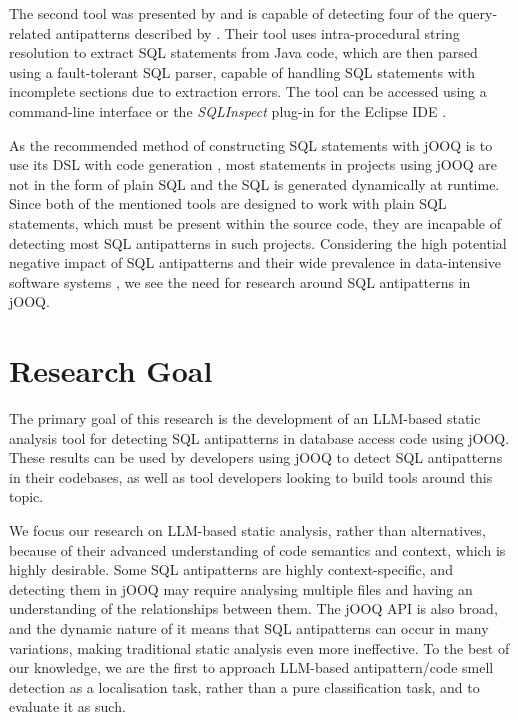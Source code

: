 \documentclass{article}
\begin{document}
The second tool was presented by \textcite{nagy2017static} and is capable of detecting four of the query-related antipatterns described by \textcite{karwin2023sql}. Their tool uses intra-procedural string resolution to extract SQL statements from Java code, which are then parsed using a fault-tolerant SQL parser, capable of handling SQL statements with incomplete sections due to extraction errors. The tool can be accessed using a command-line interface or the \emph{SQLInspect} plug-in for the Eclipse IDE \cite{nagy2017static} \cite{nagy2018sqlinspect}.

As the recommended method of constructing SQL statements with jOOQ is to use its DSL with code generation \cite{jooq2025withgen}, most statements in projects using jOOQ are not in the form of plain SQL and the SQL is generated dynamically at runtime. Since both of the mentioned tools are designed to work with plain SQL statements, which must be present within the source code, they are incapable of detecting most SQL antipatterns in such projects. Considering the high potential negative impact of SQL antipatterns \cites[p. 4]{alshemaimri2021survey}{lyu2019quantifying} and their wide prevalence in data-intensive software systems \cite{lyu2019quantifying}, we see the need for research around SQL antipatterns in jOOQ.

\section{Research Goal}

The primary goal of this research is the development of an LLM-based static analysis tool for detecting SQL antipatterns in database access code using jOOQ. These results can be used by developers using jOOQ to detect SQL antipatterns in their codebases, as well as tool developers looking to build tools around this topic.

We focus our research on LLM-based static analysis, rather than alternatives, because of their advanced understanding of code semantics and context, which is highly desirable. Some SQL antipatterns are highly context-specific, and detecting them in jOOQ may require analysing multiple files and having an understanding of the relationships between them. The jOOQ API is also broad, and the dynamic nature of it means that SQL antipatterns can occur in many variations, making traditional static analysis even more ineffective. To the best of our knowledge, we are the first to approach LLM-based antipattern/code smell detection as a localisation task, rather than a pure classification task, and to evaluate it as such.
\end{document}
